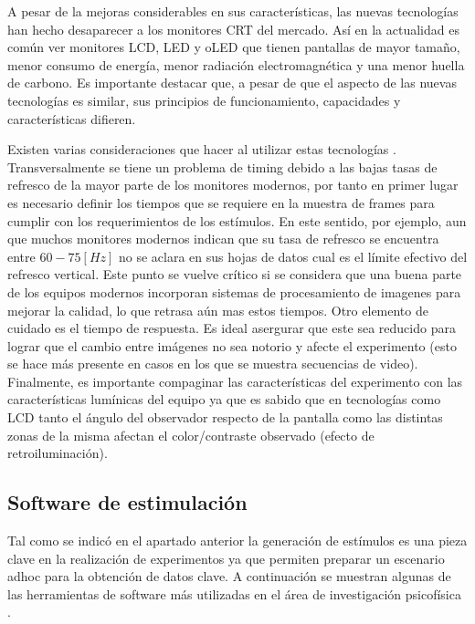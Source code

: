 \documentclass[../main.tex]{subfiles}
\begin{document}
		A pesar de la mejoras considerables en sus características, las nuevas tecnologías han hecho desaparecer a los monitores CRT del mercado. Así en la actualidad es común ver monitores LCD, LED y oLED que tienen pantallas de mayor tamaño, menor consumo de energía, menor radiación electromagnética y una menor huella de carbono. Es importante destacar que, a pesar de que el aspecto de las nuevas tecnologías es similar, sus principios de funcionamiento, capacidades y características difieren.

		Existen varias consideraciones que hacer al utilizar estas tecnologías \cite{article:monitor_wang, article:monitor_elze}. Transversalmente se tiene un problema de timing debido a las bajas tasas de refresco de la mayor parte de los monitores modernos, por tanto en primer lugar es necesario definir los tiempos que se requiere en la muestra de frames para cumplir con los requerimientos de los estímulos. En este sentido, por ejemplo, aun que muchos monitores modernos indican que su tasa de refresco se encuentra entre $60-75[Hz]$ no se aclara en sus hojas de datos cual es el límite efectivo del refresco vertical. Este punto se vuelve crítico si se considera que una buena parte de los equipos modernos incorporan sistemas de procesamiento de imagenes para mejorar la calidad, lo que retrasa aún mas estos tiempos. Otro elemento de cuidado es el tiempo de respuesta. Es ideal asergurar que este sea reducido para lograr que el cambio entre imágenes no sea notorio y afecte el experimento (esto se hace más presente en casos en los que se muestra secuencias de video). Finalmente, es importante compaginar las características del experimento con las características lumínicas del equipo ya que es sabido que en tecnologías como LCD tanto el ángulo del observador respecto de la pantalla como las distintas zonas de la misma afectan el color/contraste observado (efecto de retroiluminación). 
			
		\subsection{Software de estimulación}
		\label{sub:02_software_de_estimulacion}

			Tal como se indicó en el apartado anterior la generación de estímulos es una pieza clave en la realización de experimentos ya que permiten preparar un escenario adhoc para la obtención de datos clave. A continuación se muestran algunas de las herramientas de software más utilizadas en el área de investigación psicofísica \cite{website:software}.
\end{document}
